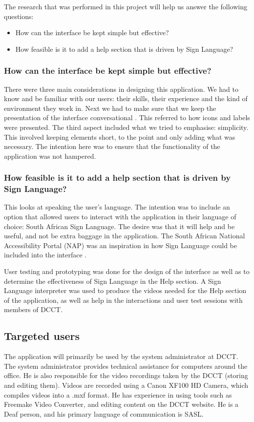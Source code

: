 \documentclass{sig-alternate-05-2015}
\begin{document}
The research that was performed in this project will help us answer the following questions:
\begin{itemize}
  \item How can the interface be kept simple but effective?
  \item How feasible is it to add a help section that is driven by Sign Language?
\end{itemize}

\subsubsection*{How can the interface be kept simple but effective?}
There were three main considerations in designing this application. We had to know and be familiar with our users: their skills, their experience and the kind of environment they work in. Next we had to make sure that we keep the presentation of the interface conversational \cite{sollenberger}. This referred to how icons and labels were presented. The third aspect included what we tried to emphasise: simplicity. This involved keeping elements short, to the point and only adding what was necessary. The intention here was to ensure that the functionality of the application was not hampered.

\subsubsection*{How feasible is it to add a help section that is driven by Sign Language?}
This looks at speaking the user's language. The intention was to include an option that allowed users to interact with the application in their language of choice: South African Sign Language. The desire was that it will help and be useful, and not be extra baggage in the application.  The South African National Accessibility Portal (NAP) was an inspiration in how Sign Language could be included into the interface \cite{coetzee2007national}.

User testing and prototyping was done for the design of the interface as well as to determine the effectiveness of Sign Language in the Help section. A Sign Language interpreter was used to produce the videos needed for the Help section of the application, as well as help in the interactions and user test sessions with members of DCCT.

\subsection{Targeted users}
The application will primarily be used by the system administrator at DCCT. The system administrator provides technical assistance for computers around the office. He is also responsible for the video recordings taken by the DCCT (storing and editing them). Videos are recorded using a Canon XF100 HD Camera, which compiles videos into a .mxf format. He has experience in using tools such as Freemake Video Converter, and editing content on the DCCT website. He is a Deaf person, and his primary language of communication is SASL.
\end{document}
